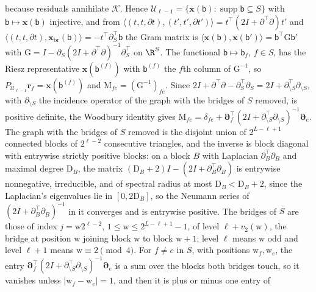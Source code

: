 because residuals annihilate \(\mathcal K\). Hence
\(\mathcal U_{\ell-1}=\{\mathbf x(\mathsf b):\operatorname{supp}\mathsf b\subseteq S\}\)
with \(\mathsf b\mapsto\mathbf x(\mathsf b)\) injective, and from
\(\langle(t,t,\partial t),(t',t',\partial t')\rangle=t^\top(2I+\partial^\top\partial)t'\)
and
\(\langle(t,t,\partial t),\mathbf x_{\mathrm{br}}(\mathsf b)\rangle=-t^\top\partial_S^\top\mathsf b\)
the Gram matrix is
\(\langle\mathbf x(\mathsf b),\mathbf x(\mathsf b')\rangle=\mathsf b^\top\mathrm G\mathsf b'\)
with \(\mathrm G=I-\partial_S(2I+\partial^\top\partial)^{-1}\partial_S^\top\)
on \(\R^S\). The functional \(\mathsf b\mapsto\mathsf b_f\), \(f\in S\), has
the Riesz representative \(\mathbf x(\mathsf b^{(f)})\) with
\(\mathsf b^{(f)}\) the \(f\)th column of \(\mathrm G^{-1}\), so
\(P_{\mathcal U_{\ell-1}}\mathbf r_f=\mathbf x(\mathsf b^{(f)})\) and
\(\mathrm M_{fe}=(\mathrm G^{-1})_{fe}\). Since
\(2I+\partial^\top\partial-\partial_S^\top\partial_S=2I+\partial_{\setminus S}^\top\partial_{\setminus S}\),
with \(\partial_{\setminus S}\) the incidence operator of the graph with the
bridges of \(S\) removed, is positive definite, the Woodbury identity gives
\(\mathrm M_{fe}=\delta_{fe}+\boldsymbol\partial_f^\top(2I+\partial_{\setminus S}^\top\partial_{\setminus S})^{-1}\boldsymbol\partial_e\).
The graph with the bridges of \(S\) removed is the disjoint union of \(2^{L-\ell+1}\)
connected blocks of \(2^{\ell-2}\) consecutive triangles, and the inverse is
block diagonal with entrywise strictly positive blocks: on a block \(B\) with
Laplacian \(\partial_B^\top\partial_B\) and maximal degree \(\mathrm D_B\),
the matrix \((\mathrm D_B+2)I-(2I+\partial_B^\top\partial_B)\) is entrywise
nonnegative, irreducible, and of spectral radius at most
\(\mathrm D_B<\mathrm D_B+2\), since the Laplacian's eigenvalues lie in
\([0,2\mathrm D_B]\), so the Neumann series of
\((2I+\partial_B^\top\partial_B)^{-1}\) in it converges and is entrywise
positive. The bridges of \(S\) are those of index \(j=\mathrm w2^{\ell-2}\),
\(1\le\mathrm w\le2^{L-\ell+1}-1\), of level \(\ell+v_2(\mathrm w)\), the
bridge at position \(\mathrm w\) joining block \(\mathrm w\) to block
\(\mathrm w+1\); level \(\ell\) means \(\mathrm w\) odd and level
\(\ell+1\) means \(\mathrm w\equiv2\pmod4\). For \(f\ne e\) in \(S\), with
positions \(\mathrm w_f,\mathrm w_e\), the entry
\(\boldsymbol\partial_f^\top(2I+\partial_{\setminus S}^\top\partial_{\setminus S})^{-1}\boldsymbol\partial_e\)
is a sum over the blocks both bridges touch, so it vanishes unless
\(|\mathrm w_f-\mathrm w_e|=1\), and then it is plus or minus one entry of
